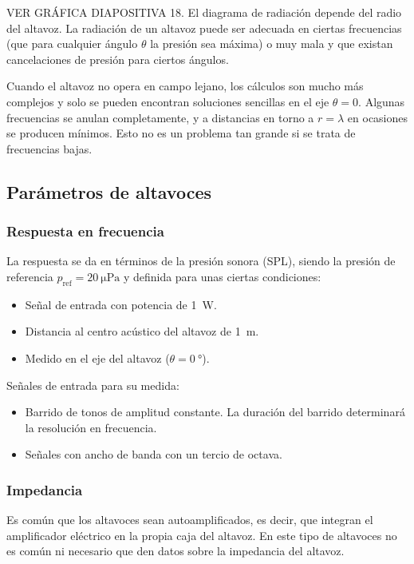 \documentclass[12pt, a4paper]{article}
\begin{document}
VER GRÁFICA DIAPOSITIVA 18. El diagrama de radiación depende del radio del altavoz. La radiación de un altavoz puede ser adecuada en ciertas frecuencias (que para cualquier ángulo $\theta$ la presión sea máxima) o muy mala y que existan cancelaciones de presión para ciertos ángulos.

Cuando el altavoz no opera en campo lejano, los cálculos son mucho más complejos y solo se pueden encontran soluciones sencillas en el eje $\theta=0$. Algunas frecuencias se anulan completamente, y a distancias en torno a $r=\lambda$ en ocasiones se producen mínimos. Esto no es un problema tan grande si se trata de frecuencias bajas.

\subsection{Parámetros de altavoces}
\subsubsection{Respuesta en frecuencia}

La respuesta se da en términos de la presión sonora (SPL), siendo la presión de referencia $p _{\text{ref}} = \qty{20}{\micro\pascal}$ y definida para unas ciertas condiciones:
\begin{itemize}
  \item Señal de entrada con potencia de \qty{1}{\watt}.
  \item Distancia al centro acústico del altavoz de \qty{1}{\meter}.
  \item Medido en el eje del altavoz ($\theta = \qty{0}{\degree}$).
\end{itemize}

Señales de entrada para su medida:
\begin{itemize}
  \item Barrido de tonos de amplitud constante. La duración del barrido determinará la resolución en frecuencia.
  \item Señales con ancho de banda con un tercio de octava.
\end{itemize}

\subsubsection{Impedancia}

Es común que los altavoces sean autoamplificados, es decir, que integran el amplificador eléctrico en la propia caja del altavoz. En este tipo de altavoces no es común ni necesario que den datos sobre la impedancia del altavoz.
\end{document}
